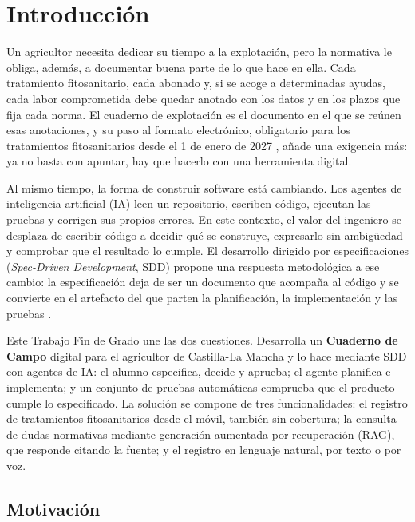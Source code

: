 \chapter{Introducción}\label{cap:Introduccion}

Un agricultor necesita dedicar su tiempo a la explotación, pero la normativa le obliga, además, a documentar buena parte de lo que hace en ella. Cada tratamiento fitosanitario, cada abonado y, si se acoge a determinadas ayudas, cada labor comprometida debe quedar anotado con los datos y en los plazos que fija cada norma. El cuaderno de explotación es el documento en el que se reúnen esas anotaciones, y su paso al formato electrónico, obligatorio para los tratamientos fitosanitarios desde el 1 de enero de 2027 \citep{rd1311-2012}, añade una exigencia más: ya no basta con apuntar, hay que hacerlo con una herramienta digital.

Al mismo tiempo, la forma de construir software está cambiando. Los agentes de inteligencia artificial (IA) leen un repositorio, escriben código, ejecutan las pruebas y corrigen sus propios errores. En este contexto, el valor del ingeniero se desplaza de escribir código a decidir qué se construye, expresarlo sin ambigüedad y comprobar que el resultado lo cumple. El desarrollo dirigido por especificaciones (\emph{Spec-Driven Development}, SDD) propone una respuesta metodológica a ese cambio: la especificación deja de ser un documento que acompaña al código y se convierte en el artefacto del que parten la planificación, la implementación y las pruebas \citep{delimarsky2025sdd}.

Este Trabajo Fin de Grado une las dos cuestiones. Desarrolla un \textbf{Cuaderno de Campo} digital para el agricultor de Castilla-La Mancha y lo hace mediante SDD con agentes de IA: el alumno especifica, decide y aprueba; el agente planifica e implementa; y un conjunto de pruebas automáticas comprueba que el producto cumple lo especificado. La solución se compone de tres funcionalidades: el registro de tratamientos fitosanitarios desde el móvil, también sin cobertura; la consulta de dudas normativas mediante generación aumentada por recuperación (RAG), que responde citando la fuente; y el registro en lenguaje natural, por texto o por voz.

\section{Motivación}\label{sec:Motivacion}

